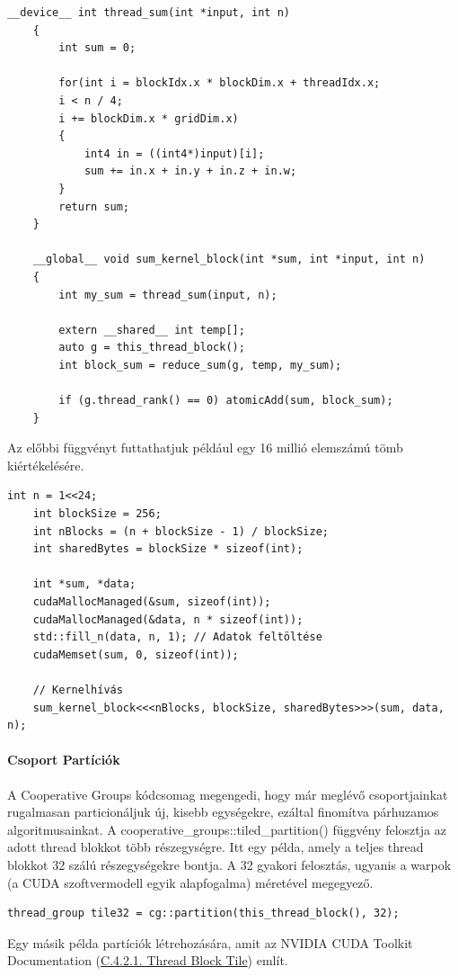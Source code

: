 \begin{lstlisting}[style=CStyle]
	__device__ int thread_sum(int *input, int n) 
	{
		int sum = 0;
		
		for(int i = blockIdx.x * blockDim.x + threadIdx.x;
		i < n / 4; 
		i += blockDim.x * gridDim.x)
		{
			int4 in = ((int4*)input)[i];
			sum += in.x + in.y + in.z + in.w;
		}
		return sum;
	}
	
	__global__ void sum_kernel_block(int *sum, int *input, int n)
	{
		int my_sum = thread_sum(input, n);
		
		extern __shared__ int temp[];
		auto g = this_thread_block();
		int block_sum = reduce_sum(g, temp, my_sum);
		
		if (g.thread_rank() == 0) atomicAdd(sum, block_sum);
	}
\end{lstlisting}

Az előbbi függvényt futtathatjuk például egy 16 millió elemszámú tömb kiértékelésére.
\begin{lstlisting}[style=CStyle]
	int n = 1<<24;
	int blockSize = 256;
	int nBlocks = (n + blockSize - 1) / blockSize;
	int sharedBytes = blockSize * sizeof(int);
	
	int *sum, *data;
	cudaMallocManaged(&sum, sizeof(int));
	cudaMallocManaged(&data, n * sizeof(int));
	std::fill_n(data, n, 1); // Adatok feltöltése
	cudaMemset(sum, 0, sizeof(int));
	
	// Kernelhívás
	sum_kernel_block<<<nBlocks, blockSize, sharedBytes>>>(sum, data, n);
\end{lstlisting}


\paragraph{Csoport Partíciók}
A Cooperative Groups kódcsomag megengedi, hogy már meglévő csoportjainkat rugalmasan particionáljuk új, kisebb egységekre, ezáltal finomítva párhuzamos algoritmusainkat. A cooperative\_groups::tiled\_partition() függvény felosztja az adott thread blokkot több részegységre. Itt egy példa, amely a teljes thread blokkot 32 szálú részegységekre bontja. A 32 gyakori felosztás, ugyanis a warpok (a CUDA szoftvermodell egyik alapfogalma) méretével megegyező.
\begin{lstlisting}[style=CStyle]
	thread_group tile32 = cg::partition(this_thread_block(), 32);
\end{lstlisting}

Egy másik példa partíciók létrehozására, amit az NVIDIA CUDA Toolkit Documentation (\href{https://docs.nvidia.com/cuda/cuda-c-programming-guide/index.html#thread-block-tile-group-cg}{C.4.2.1. Thread Block Tile}) említ.


